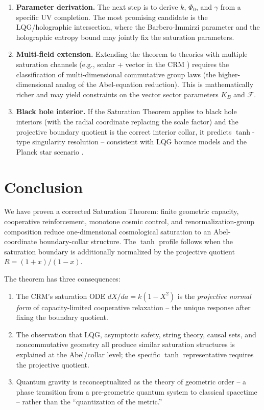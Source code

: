 \documentclass[aps,prd,twocolumn,superscriptaddress,nofootinbib]{revtex4-2}
\begin{document}
\begin{enumerate}
\item \textbf{Parameter derivation.} The next step is to derive $k$, $\Phi_0$, and $\gamma$ from a specific UV completion. The most promising candidate is the LQG/holographic intersection, where the Barbero-Immirzi parameter and the holographic entropy bound may jointly fix the saturation parameters.

\item \textbf{Multi-field extension.} Extending the theorem to theories with multiple saturation channels (e.g., scalar + vector in the CRM \cite{Geiger2026d}) requires the classification of multi-dimensional commutative group laws (the higher-dimensional analog of the Abel-equation reduction). This is mathematically richer and may yield constraints on the vector sector parameters $K_B$ and $\mathcal{F}$.

\item \textbf{Black hole interior.} If the Saturation Theorem applies to black hole interiors (with the radial coordinate replacing the scale factor) and the projective boundary quotient is the correct interior collar, it predicts $\tanh$-type singularity resolution -- consistent with LQG bounce models \cite{Ashtekar2006} and the Planck star scenario \cite{Rovelli2014}.
\end{enumerate}


\section{Conclusion}
\label{sec:conclusion}

We have proven a corrected Saturation Theorem: finite geometric capacity, cooperative reinforcement, monotone cosmic control, and renormalization-group composition reduce one-dimensional cosmological saturation to an Abel-coordinate boundary-collar structure. The $\tanh$ profile follows when the saturation boundary is additionally normalized by the projective quotient $R=(1+x)/(1-x)$.

The theorem has three consequences:

\begin{enumerate}
\item The CRM's saturation ODE $dX/da = k(1-X^2)$ is the \textit{projective normal form} of capacity-limited cooperative relaxation -- the unique response after fixing the boundary quotient.

\item The observation that LQG, asymptotic safety, string theory, causal sets, and noncommutative geometry all produce similar saturation structures is explained at the Abel/collar level; the specific $\tanh$ representative requires the projective quotient.

\item Quantum gravity is reconceptualized as the theory of geometric order -- a phase transition from a pre-geometric quantum system to classical spacetime -- rather than the ``quantization of the metric.''
\end{enumerate}
\end{document}
